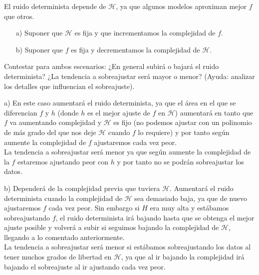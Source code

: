 \documentclass[12pt]{article}
\theoremstyle{definition}
\begin{document}
\begin{pregunta}
El ruido determinista depende de $\mathcal{H}$, ya que algunos modelos aproximan mejor $f$ que otros.
\begin{enumerate}
\item[a)] Suponer que $\mathcal{H}$ es fija y que incrementamos la complejidad de $f$.
\item[b)] Suponer que $f$ es fija y decrementamos la complejidad de $\mathcal{H}$.
\end{enumerate}
Contestar para ambos escenarios: ¿En general subirá o bajará el ruido determinista? ¿La tendencia a sobreajustar será mayor o menor? (Ayuda: analizar los detalles que influencian el sobreajuste).\\

\item[a)] En este caso aumentará el ruido determinista, ya que el área en el que se diferencian $f$ y $h$ (donde $h$ es el mejor ajuste de $f$ en $\mathcal{H}$) aumentará en tanto que $f$ va aumentando complejidad y $\mathcal{H}$ es fijo (no podemos ajustar con un polinomio de más grado del que nos deje $\mathcal{H}$ cuando $f$ lo requiere) y por tanto según aumente la complejidad de $f$ ajustaremos cada vez peor.\\
La tendencia a sobreajustar será menor ya que según aumente la complejidad de la $f$ estaremos ajustando peor con $h$ y por tanto no se podrán sobreajustar los datos.
\item[b)] Dependerá de la complejidad previa que tuviera $\mathcal{H}$. Aumentará el ruido determinista cuando la complejidad de $\mathcal{H}$ sea demasiado baja, ya que de nuevo ajustaremos $f$ cada vez peor. Sin embargo si $H$ era muy alta y estábamos sobreajustando $f$, el ruido determinista irá bajando hasta que se obtenga el mejor ajuste posible y volverá a subir si seguimos bajando la complejidad de $\mathcal{H}$, llegando a lo comentado anteriormente.\\
La tendencia a sobreajustar será menor si estábamos sobreajustando los datos al tener muchos grados de libertad en $\mathcal{H}$, ya que al ir bajando la complejidad irá bajando el sobreajuste al ir ajustando cada vez peor.
\end{pregunta}
\end{document}
